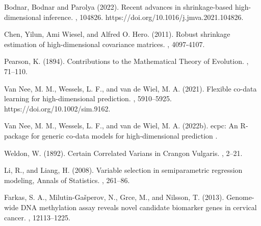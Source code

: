 \begin{thebibliography}{}
Bodnar, Bodnar and Parolya (2022).
\newblock Recent advances in shrinkage-based high-dimensional inference.
,
104826. https://doi.org/10.1016/j.jmva.2021.104826.

Chen, Yilun, Ami Wiesel, and Alfred O. Hero. (2011).
\newblock Robust shrinkage estimation of high-dimensional covariance matrices.
,
4097-4107.	

Pearson, K. (1894).
\newblock Contributions to the Mathematical Theory of Evolution.
,
71--110.

Van Nee, M. M., Wessels, L. F., and van de Wiel, M. A. (2021).
\newblock Flexible co-data learning for high-dimensional prediction.
,
5910--5925.
\newblock https://doi.org/10.1002/sim.9162.


Van Nee, M. M., Wessels, L. F., and van de Wiel, M. A. (2022b).
\newblock ecpc: An R‐package for generic co‐data models for high‐dimensional prediction
.



Weldon, W. (1892).
\newblock Certain Correlated Varians in Crangon Vulgaris.
,
2--21.

Li, R., and Liang, H. (2008).
\newblock Variable selection in semiparametric regression modeling, Annals of Statistics.
,
261--86.


Farkas, S. A., Milutin-Gašperov, N.,  Grce, M., and Nilsson, T. (2013).
\newblock Genome-wide DNA methylation assay reveals novel candidate biomarker genes in cervical cancer.
,
12113--1225.


\end{thebibliography}
